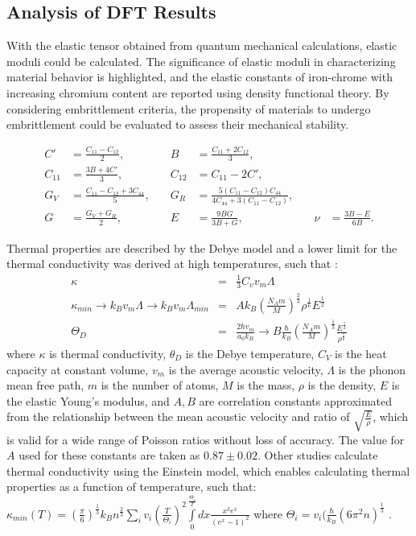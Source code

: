 \documentclass[final,3p,times]{elsarticle}
\begin{document}
\subsection{Analysis of DFT Results}
With the elastic tensor obtained from quantum mechanical calculations, elastic moduli could be calculated. The significance of elastic moduli in characterizing material behavior is highlighted, and the elastic constants of iron-chrome with increasing chromium content are reported using density functional theory. By considering embrittlement criteria, the propensity of materials to undergo embrittlement could be evaluated to assess their mechanical stability.

\begin{equation}
\begin{aligned}
C' &= \frac{C_{11}-C_{12}}{2}, 
&\quad 
B &= \frac{C_{11}+2C_{12}}{3}, \\
C_{11} &= \frac{3B+4C'}{3}, 
&\quad 
C_{12} &= C_{11}-2C', \\
G_V &= \frac{C_{11}-C_{12}+3C_{44}}{5}, 
&\quad 
G_R &= \frac{5(C_{11}-C_{12})C_{44}}{4C_{44}+3(C_{11}-C_{12})}, \\
G &= \frac{G_V+G_R}{2}, 
&\quad 
E &= \frac{9BG}{3B+G}, 
&\quad 
\nu &= \frac{3B-E}{6B}.
\end{aligned}
\end{equation}


Thermal properties are described by the Debye model and a lower limit for the thermal conductivity was derived at high temperatures, such that \cite{clarke2003materialsselection,clarke2003materialsdesign}: 
\begin{eqnarray}
    \kappa &=& \frac{1}{3} C_v v_m \Lambda \\ \label{eqn:kappa-debye}
    \kappa_{min} \rightarrow k_B v_m \Lambda \rightarrow k_B v_m \Lambda_{min} &=& A k_B (\frac{N_A m}{M})^{\frac{2}{3}} \rho^{\frac{1}{6}} E^{\frac{1}{2}} \label{eqn:kappa-min-debye} \\
    \Theta_D &=& \frac{2\hbar v_m}{a_0 k_B} \rightarrow B \frac{\hbar}{k_B} (\frac{N_A m}{M})^{\frac{1}{3}} \frac{E^{\frac{1}{2}} }{\rho^{\frac{1}{6}}} \label{eqn:debye-temp-debye}
\end{eqnarray}
where $\kappa$ is thermal conductivity, $\theta_D$ is the Debye temperature, $C_V$ is the heat capacity at constant volume, $v_m$ is the average acoustic velocity, $\Lambda$ is the phonon mean free path, $m$ is the number of atoms, $M$ is the mass, $\rho$ is the density, $E$ is the elastic Young's modulus, and $A, B$ are correlation constants approximated from the relationship between the mean acoustic velocity and ratio of $\sqrt{\frac{E}{\rho}}$, which is valid for a wide range of Poisson ratios without loss of accuracy. The value for $A$ used for these constants are taken as $0.87 \pm 0.02$. Other studies calculate thermal conductivity using the Einstein model, which enables calculating thermal properties as a function of temperature, such that: $\kappa_{min} (T) = (\frac{\pi}{6})^{\frac{1}{3}} k_B n^{\frac{2}{3}} \sum\limits_{i} v_i (\frac{T}{\Theta_i})^2 \int\limits_{0}^{\frac{\Theta_i}{T}} dx \frac{x^3 e^x}{(e^x -1)^2}$ where $\Theta_i = v_i (\frac{\hbar}{k_B} (6\pi^2n)^{\frac{1}{3}} $ \cite{cahill1992lower}.
\end{document}
